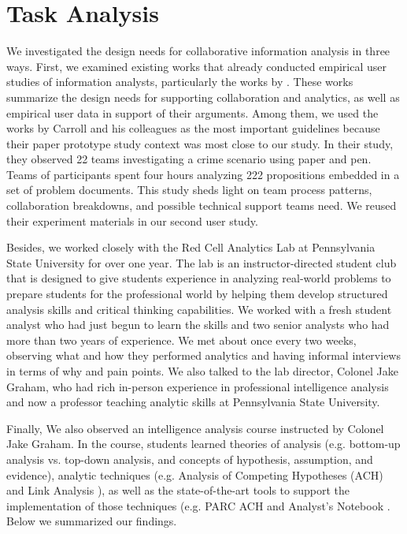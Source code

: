 \section{Task Analysis}

We investigated the design needs for collaborative information analysis in three ways. First, we examined existing works that already conducted empirical user studies of information analysts, particularly the works by \citep{Chin2009,Carroll2013,Pirolli2005, Kang2012,Kang2012d}. These works summarize the design needs for supporting collaboration and analytics, as well as empirical user data in support of their arguments. Among them, we used the works by Carroll and his colleagues \citep{Carroll2013,Borge2012,Borge2014} as the most important guidelines because their paper prototype study context was most close to our study. In their study, they observed 22 teams investigating a crime scenario using paper and pen. Teams of participants spent four hours analyzing 222 propositions embedded in a set of problem documents. This study sheds light on team process patterns, collaboration breakdowns, and possible technical support teams need. We reused their experiment materials in our second user study.

Besides, we worked closely with the Red Cell Analytics Lab at Pennsylvania State University for over one year. The lab is an instructor-directed student club that is designed to give students experience in analyzing real-world problems to prepare students for the professional world by helping them develop structured analysis skills and critical thinking capabilities. We worked with a fresh student analyst who had just begun to learn the skills and two senior analysts who had more than two years of experience. We met about once every two weeks, observing what and how they performed analytics and having informal interviews in terms of why and pain points.  We also talked to the lab director, Colonel Jake Graham, who had rich in-person experience in professional intelligence analysis and now a professor teaching analytic skills at Pennsylvania State University. 

Finally, We also observed an intelligence analysis course instructed by Colonel Jake Graham. In the course, students learned theories of analysis (e.g. bottom-up analysis vs. top-down analysis, and concepts of hypothesis, assumption, and evidence), analytic techniques (e.g. Analysis of Competing Hypotheses (ACH) \citep{Heuer1999} and Link Analysis \citep{Sparrow1991}), as well as the state-of-the-art tools to support the implementation of those techniques (e.g. PARC ACH \citep{PARC} and Analyst’s Notebook \citep{IBM}. Below we summarized our findings.

